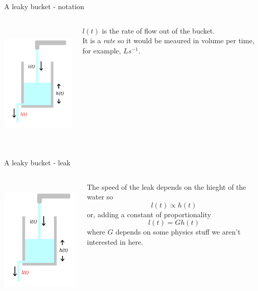 \documentclass{beamer}
\newcommand{\crish}{\color{reddish}}
\newcommand{\cbla}{\color{black}}
\newcommand{\cred}{\color{red}}
\begin{document}
\begin{frame}{A leaky bucket - notation}
\begin{columns}
\begin{column}{0.5\textwidth}
  \begin{center}
     \includegraphics[height=6cm]{glass_l_red.png}      
     \end{center}
\end{column}
\begin{column}{0.5\textwidth}
  \cred{} $l(t)$\color{black}{} is the rate of flow out of the
  bucket.\\[1cm] It is a \textsl{rate} so it would be meaured in
  volume per time, for example, \crish$Ls^{-1}$\cbla.
  
\end{column}
\end{columns}
\end{frame}


\begin{frame}{A leaky bucket - leak}
\begin{columns}
\begin{column}{0.5\textwidth}
  \begin{center}
     \includegraphics[height=6cm]{glass_l_red.png}      
     \end{center}
\end{column}
\begin{column}{0.5\textwidth}
  The speed of the leak depends on the hieght of the water so\crish
  $$l(t)\propto h(t)$$
  \cbla{}or, adding a constant of proportionality\crish
  $$l(t)=Gh(t)$$
  \cbla{}where \crish{}$G$\cbla{} depends on some physics stuff we aren't interested in here.


  
\end{column}
\end{columns}
\end{frame}
\end{document}

